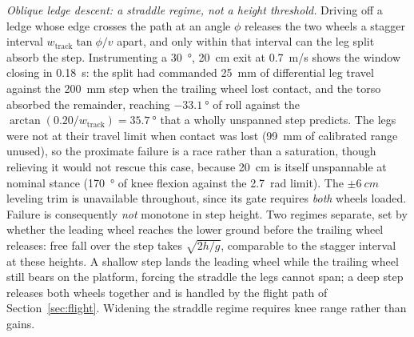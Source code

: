 \documentclass[a4paper,fleqn]{cas-dc}
\begin{document}
\emph{Oblique ledge descent: a straddle regime, not a height threshold.}
Driving off a ledge whose edge crosses the path at an angle $\phi$ releases the
two wheels a stagger interval $w_{\text{track}}\tan\phi/v$ apart, and only within
that interval can the leg split absorb the step. Instrumenting a
\SI{30}{\degree}, \SI{20}{cm} exit at \SI{0.7}{m/s} shows the window closing in
\SI{0.18}{s}: the split had commanded \SI{25}{mm} of differential leg travel
against the \SI{200}{mm} step when the trailing wheel lost contact, and the torso
absorbed the remainder, reaching $\SI{-33.1}{\degree}$ of roll against the
$\arctan(0.20/w_{\text{track}}){=}\SI{35.7}{\degree}$ that a wholly unspanned step
predicts. The legs were not at their travel limit when contact was lost
(\SI{99}{mm} of calibrated range unused), so the proximate failure is a race rather than a saturation, though relieving it would not rescue this case,
because \SI{20}{cm} is itself unspannable at nominal stance (\SI{170}{\degree} of
knee flexion against the \SI{2.7}{rad} limit). The $\pm\SI{6}{cm}$ leveling trim
is unavailable throughout, since its gate requires \emph{both} wheels loaded.
Failure is consequently \emph{not} monotone in step height. Two regimes separate,
set by whether the leading wheel reaches the lower ground before the trailing wheel releases: free fall over the step takes $\sqrt{2h/g}$, comparable to the
stagger interval at these heights. A shallow step lands the leading wheel while
the trailing wheel still bears on the platform, forcing the straddle the legs
cannot span; a deep step releases both wheels together and is handled by the
flight path of Section~\ref{sec:flight}. Widening the straddle regime requires knee
range rather than gains.
\end{document}
